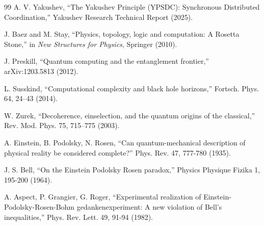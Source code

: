 \documentclass[11pt,a4paper]{article}
\begin{document}
\begin{thebibliography}{99}
		 A. V. Yakushev, ``The Yakushev Principle (YPSDC): Synchronous Distributed Coordination,'' Yakushev Research Technical Report (2025).
		
		 J. Baez and M. Stay, ``Physics, topology, logic and computation: A Rosetta Stone,'' in \emph{New Structures for Physics}, Springer (2010).
		
		 J. Preskill, ``Quantum computing and the entanglement frontier,'' arXiv:1203.5813 (2012).
		
		 L. Susskind, ``Computational complexity and black hole horizons,'' Fortsch. Phys. 64, 24–43 (2014).
		
		 W. Zurek, ``Decoherence, einselection, and the quantum origins of the classical,'' Rev. Mod. Phys. 75, 715–775 (2003).
		
		 A. Einstein, B. Podolsky, N. Rosen, ``Can quantum-mechanical description of physical reality be considered complete?'' Phys. Rev. 47, 777-780 (1935).
		
		 J. S. Bell, ``On the Einstein Podolsky Rosen paradox,'' Physics Physique Fizika 1, 195-200 (1964).
		
		 A. Aspect, P. Grangier, G. Roger, ``Experimental realization of Einstein-Podolsky-Rosen-Bohm gedankenexperiment: A new violation of Bell's inequalities,'' Phys. Rev. Lett. 49, 91-94 (1982).
		
	\end{thebibliography}
	
\end{document}
